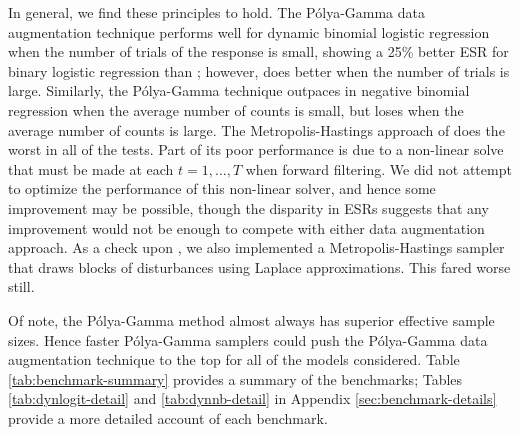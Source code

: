 \documentclass[12pt]{article}
\newcommand{\Polya}{P\'{o}lya}
\begin{document}
In general, we find these principles to hold.  The \Polya-Gamma data
augmentation technique performs well for dynamic binomial logistic regression
when the number of trials of the response is small, showing a 25\% better ESR
for binary logistic regression than \cite{fussl-etal-2013}; however,
\cite{fussl-etal-2013} does better when the number of trials is large.
Similarly, the \Polya-Gamma technique outpaces
\cite{fruhwirth-schnatter-etal-2009} in negative binomial regression when the
average number of counts is small, but loses when the average number of counts
is large.  The Metropolis-Hastings approach of \cite{ravines-etal-2006} does the
worst in all of the tests.  Part of its poor performance is due to a non-linear
solve that must be made at each $t=1, \ldots, T$ when forward filtering.  We did
not attempt to optimize the performance of this non-linear solver, and hence
some improvement may be possible, though the disparity in ESRs suggests that any
improvement would not be enough to compete with either data augmentation
approach.  As a check upon \cite{ravines-etal-2006}, we also implemented a
Metropolis-Hastings sampler that draws blocks of disturbances using Laplace
approximations.  This fared worse still.

Of note, the \Polya-Gamma method almost always has superior effective sample
sizes.  Hence faster \Polya-Gamma samplers could push the \Polya-Gamma data
augmentation technique to the top for all of the models considered.  Table
\ref{tab:benchmark-summary} provides a summary of the benchmarks; Tables
\ref{tab:dynlogit-detail} and \ref{tab:dynnb-detail} in Appendix
\ref{sec:benchmark-details} provide a more detailed account of each benchmark.
\end{document}
